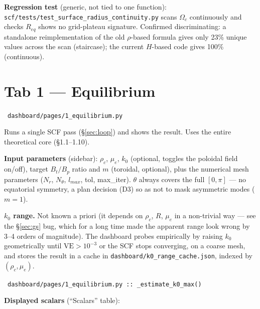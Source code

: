 \documentclass[11pt,a4paper]{scrartcl}
\newcommand{\arrowto}[1]{%
  \par\vspace{2pt}\noindent{\color{linkblue}$\rightarrow$}~\texttt{\small #1}\par\vspace{2pt}}
\newcommand{\code}[1]{\texttt{\small #1}}
\begin{document}
\textbf{Regression test} (generic, not tied to one function):
\code{scf/tests/test\_surface\_radius\_continuity.py} scans $\Omega_c$
continuously and checks $R_{eq}$ shows no grid-plateau signature.
Confirmed discriminating: a standalone reimplementation of the old
$\rho$-based formula gives only 23\% unique values across the scan
(staircase); the current $H$-based code gives 100\% (continuous).

\clearpage
\section{Tab 1 --- Equilibrium}
\label{sec:aba1}

\arrowto{dashboard/pages/1\_equilibrium.py}

Runs a single SCF pass (\S\ref{sec:loop}) and shows the result. Uses the
entire theoretical core (\S1.1--1.10).

\textbf{Input parameters} (sidebar): $\rho_c$, $\mu_e$, $k_0$ (optional,
toggles the poloidal field on/off), target $B_t/B_p$ ratio and $m$
(toroidal, optional), plus the numerical mesh parameters ($N_r$,
$N_\theta$, $l_{max}$, tol, max\_iter). $\theta$ always covers the full
$[0,\pi]$ --- no equatorial symmetry, a plan decision (D3) so as not to
mask asymmetric modes ($m=1$).

\textbf{$k_0$ range.} Not known a priori (it depends on $\rho_c$, $R$,
$\mu_e$ in a non-trivial way --- see the \S\ref{sec:gs} bug, which for a
long time made the apparent range look wrong by 3--4 orders of
magnitude). The dashboard probes empirically by raising $k_0$
geometrically until $\mathrm{VE}>10^{-3}$ or the SCF stops converging, on
a coarse mesh, and stores the result in a cache in
\code{dashboard/k0\_range\_cache.json}, indexed by $(\rho_c,\mu_e)$.
\arrowto{dashboard/pages/1\_equilibrium.py :: \_estimate\_k0\_max()}

\textbf{Displayed scalars} (``Scalars'' table):
\end{document}
